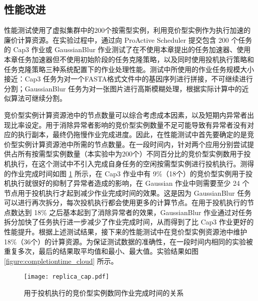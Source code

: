\subsection{性能改进}
\label{sec:no2_perf}
性能测试使用了虚拟集群中的200个按需型实例，利用竞价型实例作为执行加速的廉价计算资源。在实验过程中，通过向 ProActive Scheduler 提交包含 200 个任务的 Cap3 作业或 GaussianBlur 作业测试了在不使用本章提出的任务加速器、使用本章任务加速器但不使用初始阶段的任务克隆策略，以及同时使用投机执行策略和任务克隆策略三种系统配置下的作业处理性能。测试中所使用的作业任务规模大小接近：Cap3 任务为对一个FASTA格式文件中的基因序列进行拼接，不可继续进行分割；GaussianBlur 任务为对一张图片进行高斯模糊处理，根据实际计算中的近似算法可继续分割。

竞价型实例计算资源池中的节点数量可以综合考虑成本因素，以及短期内异常者出现比率设定。用于消除异常者影响的竞价型实例数量不足可能导致有异常者没有对应的执行副本，最终仍拖慢作业完成进度。因此，在性能测试中首先要确定的是竞价型实例计算资源池中所需的节点数量。在一段时间内，针对两个应用分别尝试提供占所有按需型实例数量（本实验中为200个）不同百分比的竞价型实例数用于投机执行，在这个测试中不引入完成自身任务的空闲按需型实例进行投机执行。测得的作业完成时间如图 \ref{figure:replica_cap} 所示，在 Cap3 作业中有 9\%（18个）的竞价型实例用于投机执行就很好的抑制了异常者造成的影响，在 Gaussian 作业中则需要至少 24 个节点用于投机执行才起到减少作业完成时间的效果。这是因为 GaussianBlur 任务可以进行再次拆分，每次投机执行都会使用更多的计算节点。在用于投机执行的节点数达到 18\% 之后基本起到了消除异常者的效果，GaussianBlur 作业通过对任务拆分加快了任务执行进一步减少了作业完成时间，从而得到了比 Cap3 作业更好的性能提升。根据上述测试结果，接下来的性能测试中在竞价型实例资源池中维护 18\%（36个）的计算资源。为保证测试数据的准确性，在一段时间内相同的实验被重复多次，最后的结果取平均值和最小、最大值。实验结果如图 \ref{figure:completiontime_cloud} 所示。
\begin{figure}
  \centering
  \texttt{[image: replica\_cap.pdf]}
  \caption{用于投机执行的竞价型实例数同作业完成时间的关系}
  \label{figure:replica_cap}
\end{figure}

